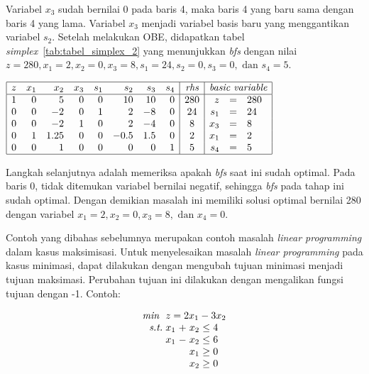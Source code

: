 Variabel \(x_3\) sudah bernilai 0 pada baris 4, maka baris 4 yang baru sama dengan baris 4 yang lama. Variabel \(x_3\) menjadi variabel basis baru yang menggantikan variabel \(s_2\). Setelah melakukan OBE, didapatkan tabel \textit{simplex}~\ref{tab:tabel_simplex_2} yang menunjukkan \textit{bfs} dengan nilai \(z=280, x_1=2, x_2=0, x_3=8, s_1=24, s_2=0, s_3=0, \text{ dan } s_4=5\).

\begin{center}
	\label{tab:tabel_simplex_2}
	$
	\begin{array}{|r r r r r r r r|c|r c l|}
		\hline
		z & x_1 & x_2 & x_3 & s_1 & s_2 & s_3 & s_4 & \textit{rhs} & \multicolumn{3}{c|}{\textit{basic variable}}\\
		\hline
		1 & 0 & 5 & 0 & 0 & 10 & 10 & 0 & 280 & z & = & 280\\
		0 & 0 & -2 & 0 & 1 & 2 & -8 & 0 & 24 & s_1 & = & 24\\
		0 & 0 & -2 & 1 & 0 & 2 & -4 & 0 & 8 & x_3 & = & 8\\
		0 & 1 & 1.25 & 0 & 0 & -0.5 & 1.5 & 0 & 2 & x_1 & = & 2\\
		0 & 0 & 1 & 0 & 0 & 0 & 0 & 1 & 5 & s_4 & = & 5\\
		\hline
	\end{array}
	$
\end{center}

Langkah selanjutnya adalah memeriksa apakah \textit{bfs} saat ini sudah optimal. Pada baris 0, tidak ditemukan variabel bernilai negatif, sehingga \textit{bfs} pada tahap ini sudah optimal. Dengan demikian masalah ini memiliki solusi optimal bernilai 280 dengan variabel \(x_1=2, x_2=0, x_3=8, \text{ dan } x_4 = 0\).

Contoh yang dibahas sebelumnya merupakan contoh masalah \textit{linear programming} dalam kasus maksimisasi. Untuk menyelesaikan masalah \textit{linear programming} pada kasus minimasi, dapat dilakukan dengan mengubah tujuan minimasi menjadi tujuan maksimasi. Perubahan tujuan ini dilakukan dengan mengalikan fungsi tujuan dengan -1. Contoh:

\begin{equation*}
	\setlength\arraycolsep{1.5pt}
	\begin{array}{r r c r c l}
		\textit{min } &\multicolumn{5}{l}{z = 2x_1 - 3x_2}\\
		\textit{s.t.} &x_1 &+ &x_2 &\leq &4\\
		&x_1 &- &x_2 &\leq &6\\
		&&&x_1 &\geq &0\\
		&&&x_2 &\geq &0\\
	\end{array}
\end{equation*}

